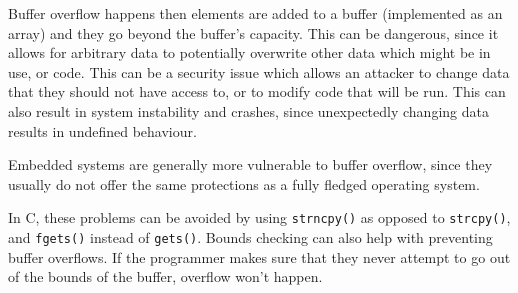 Buffer overflow happens then elements are added to a buffer (implemented as an
array) and they go beyond the buffer's capacity. This can be dangerous, since it
allows for arbitrary data to potentially overwrite other data which might be in
use, or code. This can be a security issue which allows an attacker to change
data that they should not have access to, or to modify code that will be run.
This can also result in system instability and crashes, since unexpectedly
changing data results in undefined behaviour. 

Embedded systems are generally more vulnerable to buffer overflow, since they
usually do not offer the same protections as a fully fledged operating system.

In C, these problems can be avoided by using \texttt{strncpy()} as opposed to
\texttt{strcpy()}, and \texttt{fgets()} instead of \texttt{gets()}. Bounds
checking can also help with preventing buffer overflows. If the programmer makes
sure that they never attempt to go out of the bounds of the buffer, overflow
won't happen. 

